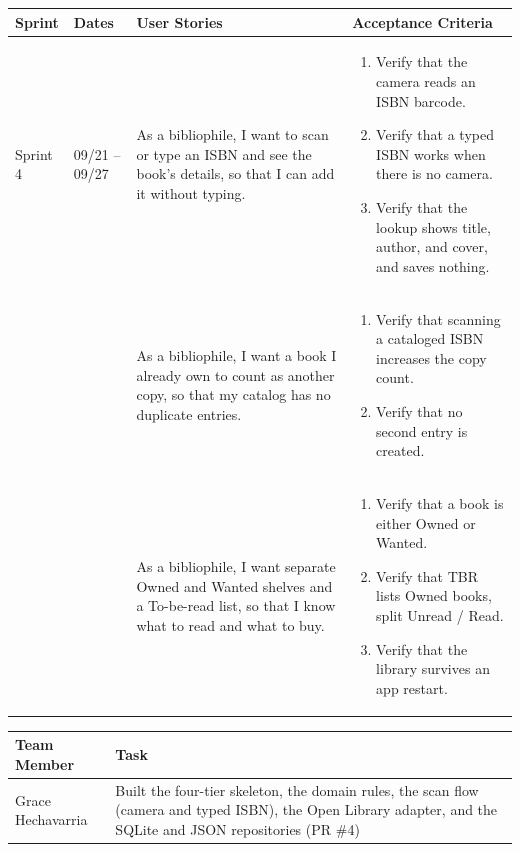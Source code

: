 \documentclass[12pt]{article}
\begin{document}
\noindent\begin{minipage}{\linewidth}

\vspace{0.5em}
\noindent
\begin{tabular}{|L{1.2cm}|L{1.8cm}|L{5.2cm}|L{6.3cm}|}
\hline
\textbf{Sprint} & \textbf{Dates} & \textbf{User Stories} & \textbf{Acceptance Criteria} \\
\hline
Sprint 4 & 09/21 -- 09/27 &
As a bibliophile, I want to scan or type an ISBN and see the book's details, so that I can add it without typing. &
\begin{enumerate}
    \item Verify that the camera reads an ISBN barcode.
    \item Verify that a typed ISBN works when there is no camera.
    \item Verify that the lookup shows title, author, and cover, and saves nothing.
\end{enumerate} \\
& &
As a bibliophile, I want a book I already own to count as another copy, so that my catalog has no duplicate entries. &
\begin{enumerate}
    \item Verify that scanning a cataloged ISBN increases the copy count.
    \item Verify that no second entry is created.
\end{enumerate} \\
& &
As a bibliophile, I want separate Owned and Wanted shelves and a To-be-read list, so that I know what to read and what to buy. &
\begin{enumerate}
    \item Verify that a book is either Owned or Wanted.
    \item Verify that TBR lists Owned books, split Unread / Read.
    \item Verify that the library survives an app restart.
\end{enumerate} \\
\hline
\end{tabular}

\vspace{0.5em}
\noindent
\begin{tabular}{|L{3.4cm}|L{11.6cm}|}
\hline
\textbf{Team Member} & \textbf{Task} \\
\hline
Grace Hechavarria & Built the four-tier skeleton, the domain rules, the scan flow (camera and typed ISBN), the Open Library adapter, and the SQLite and JSON repositories (PR \#4) \\
\hline
\end{tabular}
\end{minipage}
\end{document}
